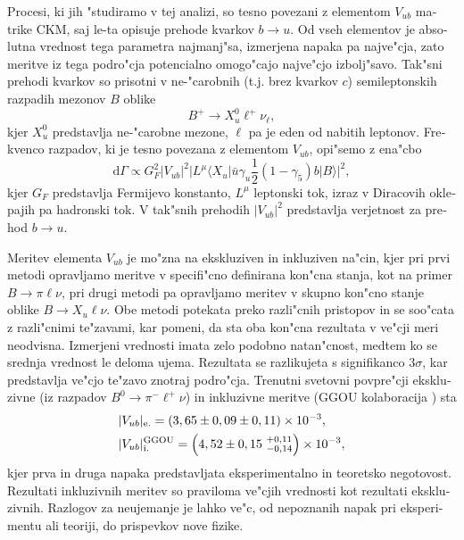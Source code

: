 \begin{otherlanguage}{slovene}
Procesi, ki jih "studiramo v tej analizi, so tesno povezani z elementom $V_{ub}$ matrike CKM, saj le-ta opisuje prehode kvarkov $b \to u$. Od vseh elementov je absolutna vrednost tega parametra najmanj"sa, izmerjena napaka pa najve"cja, zato meritve iz tega podro"cja potencialno omogo"cajo najve"cjo izbolj"savo. Tak"sni prehodi kvarkov so prisotni v ne-"carobnih (t.j. brez kvarkov $c$) semileptonskih razpadih mezonov $B$ oblike 
\begin{equation}
B^+ \to X_u^0 \ell^+ \nu_\ell,
\end{equation}
kjer $X_u^0$ predstavlja ne-"carobne mezone, $\ell$ pa je eden od nabitih leptonov. Frekvenco razpadov, ki je tesno povezana z elementom $V_{ub}$, opi"semo z ena"cbo
\begin{equation}
\mathrm{d} \Gamma \propto G_F^2 \vert V_{ub} \vert ^2 \vert L^\mu \langle X_u \vert \bar u \gamma_u \frac{1}{2} (1-\gamma_5) b \vert B \rangle \vert ^2,
\end{equation}
kjer $G_F$ predstavlja Fermijevo konstanto, $L^\mu$ leptonski tok, izraz v Diracovih oklepajih pa hadronski tok. V tak"snih prehodih $\vert V_{ub} \vert ^2$ predstavlja verjetnost za prehod $b \to u$.

Meritev elementa $V_{ub}$ je mo"zna na ekskluziven in inkluziven na"cin, kjer pri prvi metodi opravljamo meritve v specifi"cno definirana kon"cna stanja, kot na primer $B \to \pi \ell \nu$, pri drugi metodi pa opravljamo meritev v skupno kon"cno stanje oblike $B \to X_u \ell \nu$. Obe metodi potekata preko razli"cnih pristopov in se soo"cata z razli"cnimi te"zavami, kar pomeni, da sta oba kon"cna rezultata v ve"cji meri neodvisna. Izmerjeni vrednosti imata zelo podobno natan"cnost, medtem ko se srednja vrednost le deloma ujema. Rezultata se razlikujeta s signifikanco $3\sigma$, kar predstavlja ve"cjo te"zavo znotraj podro"cja. Trenutni svetovni povpre"cji \cite{Amhis:2016xyh} ekskluzivne (iz razpadov $B^0 \to \pi^- \ell^+ \nu$) in inkluzivne meritve (GGOU kolaboracija \cite{Gambino:2007rp}) sta
\begin{align}
&\vert V_{ub} \vert_{\mathrm{e.}} = \left(3,65 \pm 0,09 \pm 0,11\right)\times 10^{-3},\\
&\vert V_{ub} \vert_{\mathrm{i.}}^{\mathrm{GGOU}} = \left(4,52 \pm 0,15~{}^{+0,11}_{-0,14}\right)\times 10^{-3},
\end{align}
kjer prva in druga napaka predstavljata eksperimentalno in teoretsko negotovost. Rezultati inkluzivnih meritev so praviloma ve"cjih vrednosti kot rezultati ekskluzivnih. Razlogov za neujemanje je lahko ve"c, od nepoznanih napak pri eksperimentu ali teoriji, do prispevkov nove fizike.


\end{otherlanguage}
